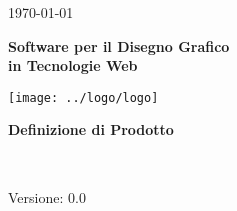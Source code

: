 \usepackage{multirow}

\title{\TITOLODOC}
\author{Stefano Dissegna}



\renewcommand{\insertversion}{0.0} %
\renewcommand{\TITOLODOC}{Definizione di Prodotto} %
\renewcommand{\glosspath}{.\glossario} %

\begin{titlepage}
\begin{center}
	\begin{Large}	\today \end{Large}
\end{center}

\vspace{20pt}

\begin{center}
	\begin{Huge}
				\textbf{\ajax}
	\end{Huge}
\end{center}			

\begin{center}
	\begin{large}
				\textbf{Software per il Disegno Grafico\\ in Tecnologie Web}
	\end{large}
\end{center}			

\vspace{20pt}

\begin{center}
\texttt{[image: ../logo/logo]}
\end{center}

\vspace{170pt}
\begin{center} %
	\begin{Huge}
				\textbf{\TITOLODOC}
	\end{Huge}
			\\
\end{center}
\vspace{190pt}
\begin{center}
Versione: \insertversion
\end{center}
\end{titlepage}

